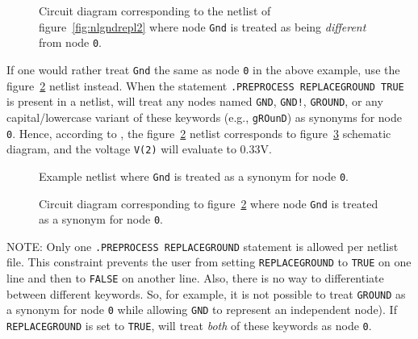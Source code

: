 \begin{figure}
\centering{}
\caption[Circuit diagram corresponding to figure\ 
\ref{fig:nlgndrepl2}.] {Circuit diagram corresponding to the netlist of figure\ 
\ref{fig:nlgndrepl2} where node \texttt{Gnd} is treated as being {\em different} 
from node \texttt{0}.} 
\label{fig:gndreplace2}
\end{figure}

If one would rather treat \texttt{Gnd} the same as node \texttt{0} in the above example, use the  figure\ 
\ref{fig:nlgndrepl1} netlist instead.  When the statement \texttt{.PREPROCESS REPLACEGROUND
TRUE} is present in a netlist, \Xyce{} will treat any nodes named \texttt{GND}, \texttt{GND!}, \texttt{GROUND}, or any capital/lowercase variant of these keywords (e.g., \texttt{gROunD}) as synonyms
for node \texttt{0}.  Hence, according to \Xyce{}, the figure\ \ref{fig:nlgndrepl1} netlist corresponds to figure\ 
\ref{fig:gndreplace1} schematic diagram, and the voltage \texttt{V(2)} will evaluate to 0.33V.

\begin{figure}[htbp]
\begin{centering}
\caption[Example netlist --- \texttt{Gnd} as a synonym for node 
\texttt{0}.] {Example netlist where \texttt{Gnd} is treated as a synonym for node 
\texttt{0}.}
\label{fig:nlgndrepl1}
\end{centering}
\end{figure}

\begin{figure}
\centering{}
\caption [Circuit diagram corresponding to figure\ \ref{fig:nlgndrepl1}.]{Circuit diagram corresponding to figure\ \ref{fig:nlgndrepl1} where 
node \texttt{Gnd} is treated as a synonym for node \texttt{0}.} 
\label{fig:gndreplace1}
\end{figure}

NOTE:	Only one \texttt{.PREPROCESS REPLACEGROUND} statement is allowed per netlist file. This constraint prevents the user from setting \texttt{REPLACEGROUND} to \texttt{TRUE} on one line and then to \texttt{FALSE} on 
another line.  Also, there is no way to differentiate between different keywords. So, for example, it is not possible to treat \texttt{GROUND} as a synonym for node \texttt{0} while allowing \texttt{GND} to represent an independent
node).  If \texttt{REPLACEGROUND} is set to \texttt{TRUE}, \Xyce{} will treat {\em both} of these keywords as node \texttt{0}.



